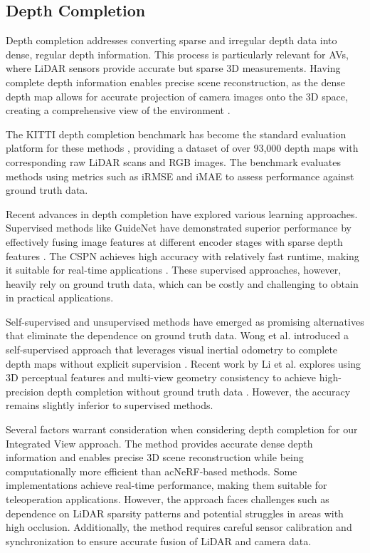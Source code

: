 \subsection{Depth Completion}

Depth completion addresses converting sparse and irregular depth data into dense, regular depth information. This process is particularly relevant for \acp{AV}, where \ac{LiDAR} sensors provide accurate but sparse 3D measurements. Having complete depth information enables precise scene reconstruction, as the dense depth map allows for accurate projection of camera images onto the 3D space, creating a comprehensive view of the environment \cite{tang2023comprehensive}.

The KITTI depth completion benchmark has become the standard evaluation platform for these methods \cite{uhrig2017sparsity}, providing a dataset of over 93,000 depth maps with corresponding raw \ac{LiDAR} scans and RGB images. The benchmark evaluates methods using metrics such as \ac{iRMSE} and \ac{iMAE} to assess performance against ground truth data.

Recent advances in depth completion have explored various learning approaches. Supervised methods like GuideNet have demonstrated superior performance by effectively fusing image features at different encoder stages with sparse depth features \cite{tang2023guidenet}. The \ac{CSPN} achieves high accuracy with relatively fast runtime, making it suitable for real-time applications \cite{cheng2020cspn}. These supervised approaches, however, heavily rely on ground truth data, which can be costly and challenging to obtain in practical applications.

Self-supervised and unsupervised methods have emerged as promising alternatives that eliminate the dependence on ground truth data. Wong et al. introduced a self-supervised approach that leverages visual inertial odometry to complete depth maps without explicit supervision \cite{wong2020unsupervised}. Recent work by Li et al. explores using 3D perceptual features and multi-view geometry consistency to achieve high-precision depth completion without ground truth data \cite{li2023self}. However, the accuracy remains slightly inferior to supervised methods.

Several factors warrant consideration when considering depth completion for our Integrated View approach. The method provides accurate dense depth information and enables precise 3D scene reconstruction while being computationally more efficient than ac{NeRF}-based methods. Some implementations achieve real-time performance, making them suitable for teleoperation applications. However, the approach faces challenges such as dependence on \ac{LiDAR} sparsity patterns and potential struggles in areas with high occlusion. Additionally, the method requires careful sensor calibration and synchronization to ensure accurate fusion of \ac{LiDAR} and camera data.

